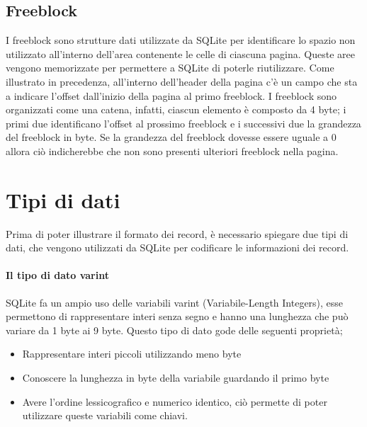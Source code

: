 \subsection{Freeblock}
I freeblock sono strutture dati utilizzate da SQLite per identificare lo spazio non utilizzato all'interno dell'area contenente le celle di ciascuna pagina.
Queste aree vengono memorizzate per permettere a SQLite di poterle riutilizzare. 
Come illustrato in precedenza, all'interno dell'header della pagina c'è un campo che sta a indicare l'offset dall'inizio della pagina al primo freeblock.
I freeblock sono organizzati come una catena, infatti, ciascun elemento è composto da 4 byte; i primi due identificano l'offset al prossimo freeblock e i successivi due la grandezza del freeblock in byte.
Se la grandezza del freeblock dovesse essere uguale a 0 allora ciò indicherebbe che non sono presenti ulteriori freeblock nella pagina.

\newpage




\section{Tipi di dati}
Prima di poter illustrare il formato dei record, è necessario spiegare due tipi di dati, che vengono utilizzati da SQLite per codificare le informazioni dei record.

\paragraph{Il tipo di dato varint}
\hfill \break
SQLite fa un ampio uso delle variabili varint (Variabile-Length Integers), esse permettono di rappresentare interi senza segno e hanno una lunghezza che può variare da 1 byte ai 9 byte. Questo tipo di dato gode delle seguenti proprietà;

\begin{itemize}
\item Rappresentare interi piccoli utilizzando meno byte
\item Conoscere la lunghezza in byte della variabile guardando il primo byte
\item Avere l'ordine lessicografico e numerico identico, ciò permette di poter utilizzare queste variabili come chiavi. 
\end{itemize}


